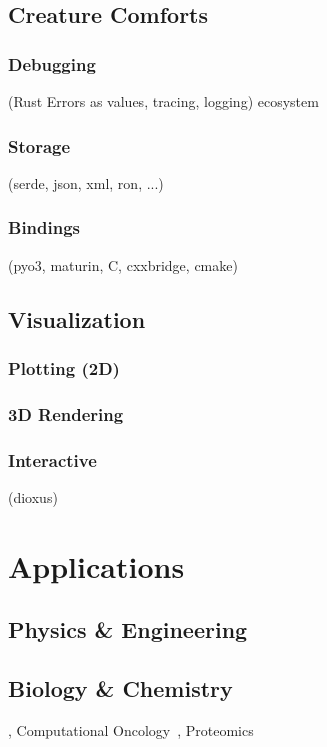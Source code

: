 \documentclass{article}
\begin{document}
\subsection{Creature Comforts}
\subsubsection{Debugging}
(Rust Errors as values, tracing, logging) ecosystem

\subsubsection{Storage}
(serde, json, xml, ron, ...)

\subsubsection{Bindings}
(pyo3, maturin, C, cxxbridge, cmake)

\subsection{Visualization}
\subsubsection{Plotting (2D)}
\subsubsection{3D Rendering}
\subsubsection{Interactive}
(dioxus)

\section{Applications}
\label{section:applications}

\subsection{Physics \& Engineering}
\subsection{Biology \& Chemistry}
\cite{Pleyer2024}, Computational Oncology~\cite{Köster2025}, Proteomics~\cite{Anechitoaie2024}
\end{document}
